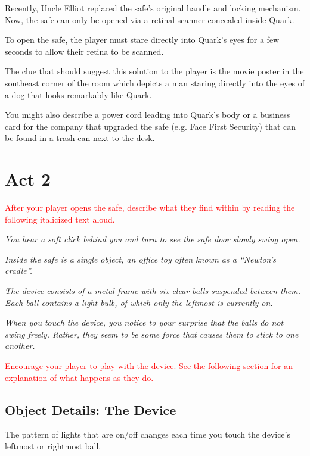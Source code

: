 \documentclass[a6paper, parskip=half, DIV=14, 12pt]{scrartcl}
\begin{document}
Recently, Uncle Elliot replaced the safe's original handle and locking mechanism.
Now, the safe can only be opened via a retinal scanner concealed inside Quark.

To open the safe, the player must stare directly into Quark's eyes for a few seconds to allow their retina to be scanned.

The clue that should suggest this solution to the player is the movie poster in the southeast corner of the room which depicts a man staring directly into the eyes of a dog that looks remarkably like Quark.

You might also describe a power cord leading into Quark's body or a business card for the company that upgraded the safe (e.g. Face First Security) that can be found in a trash can next to the desk. 

\newpage

\section*{Act 2}
\textcolor{Red}{After your player opens the safe, describe what they find within by reading the following italicized text aloud.}

\textit{You hear a soft click behind you and turn to see the safe door slowly swing open.}

\textit{Inside the safe is a single object, an office toy often known as a ``Newton's cradle''.}

\textit{The device consists of a metal frame with six clear balls suspended between them. Each ball contains a light bulb, of which only the leftmost is currently on.}

\textit{When you touch the device, you notice to your surprise that the balls do not swing freely. Rather, they seem to be some force that causes them to stick to one another.}

\textcolor{Red}{Encourage your player to play with the device. See the following section for an explanation of what happens as they do.}

\newpage

\subsection*{Object Details: The Device}
The pattern of lights that are on/off changes each time you touch the device's leftmost or rightmost ball. 
\end{document}
